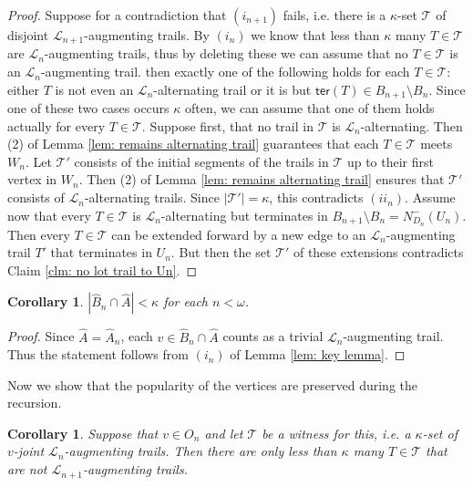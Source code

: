 \documentclass[12pt,a4paper]{amsart}
\theoremstyle{plain}
\newtheorem{corollary}[theorem]{Corollary}
\theoremstyle{definition}
\begin{document}
\begin{proof}
 Suppose for a contradiction that $ (i_{n+1}) $ fails, i.e. there is a $ \kappa $-set $ \mathcal{T} $ of disjoint $ 
 \mathcal{L}_{n+1} 
 $-augmenting trails. By $( i_n) $ we know that less than $ \kappa $ many $ T\in \mathcal{T} $ are $ \mathcal{L}_n 
 $-augmenting trails, thus by 
 deleting these we can assume that no $ T\in \mathcal{T} $ is an $ \mathcal{L}_n $-augmenting trail. then exactly one of the following holds for 
 each
  $ T\in \mathcal{T} $: either $ T $ is not even an $ \mathcal{L}_n $-alternating trail or it is but $ 
 \mathsf{ter}(T)\in B_{n+1}\setminus B_n $. Since one of these two cases occurs $ \kappa $ often, we can assume that one of them holds 
 actually for every $ T\in \mathcal{T} $. Suppose first, that no trail in $ \mathcal{T} $ is $ \mathcal{L}_n $-alternating. 
 Then  (2) of Lemma 
 \ref{lem: remains alternating trail}   guarantees that each $ 
 T\in \mathcal{T} $ meets $ W_n $. Let $ \mathcal{T}' $ consists of the initial segments of the trails in $ \mathcal{T} $ up to their first vertex in $ 
 W_n $. Then (2) 
 of Lemma \ref{lem: remains alternating trail} ensures that $ 
 \mathcal{T}' 
 $ consists of $ \mathcal{L}_n $-alternating trails. Since $ \left|\mathcal{T}'\right|=\kappa $, this contradicts $ (ii_n) $. Assume now that every 
 $ T\in \mathcal{T} $ is $ \mathcal{L}_n $-alternating but terminates in $ B_{n+1}\setminus B_n= N_{D_n}^{-}(U_n) $. Then 
 every $ T\in 
 \mathcal{T} $ can be extended forward by a new edge to  an $ \mathcal{L}_n $-augmenting trail $ T' $ that terminates in $ 
 U_n $. But then the set 
 $ \mathcal{T}' $  of these extensions contradicts Claim \ref{clm: no lot trail to Un}.
\end{proof}
\begin{corollary}\label{cor: few arrives to A}
$ \left|\widehat{B}_n\cap \widehat{A}\right|<\kappa $ for each $ n<\omega $.
\end{corollary}
\begin{proof}
Since $ \widehat{A}=\widehat{A}_n $, each $ v\in \widehat{B}_n\cap \widehat{A} $ counts as a trivial $ 
\mathcal{L}_n $-augmenting trail. Thus the statement follows from $ (i_n) $ of Lemma \ref{lem: key lemma}.
\end{proof}
Now we show that the popularity of the vertices are preserved during the recursion.
\begin{corollary}\label{cor: less than k lose}
Suppose that $ v\in O_n $ and let $ \mathcal{T} $ be a witness for this, i.e.  a $ \kappa $-set  of $ v $-joint $ \mathcal{L}_n 
$-augmenting trails. Then there are only less than $ \kappa $ many $ T\in \mathcal{T} $ that are not $ \mathcal{L}_{n+1} 
$-augmenting trails.
\end{corollary}
\end{document}
